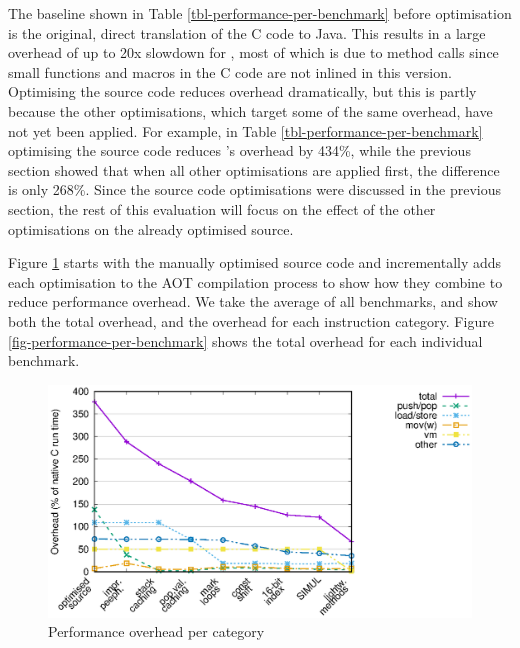 The baseline shown in Table \ref{tbl-performance-per-benchmark} before optimisation is the original, direct translation of the C code to Java. This results in a large overhead of up to 20x slowdown for , most of which is due to method calls since small functions and macros in the C code are not inlined in this version. Optimising the source code reduces overhead dramatically, but this is partly because the other optimisations, which target some of the same overhead, have not yet been applied. For example, in Table \ref{tbl-performance-per-benchmark} optimising the source code reduces 's overhead by 434\%, while the previous section showed that when all other optimisations are applied first, the difference is only 268\%. Since the source code optimisations were discussed in the previous section, the rest of this evaluation will focus on the effect of the other optimisations on the already optimised source.

Figure \ref{fig-performance-per-opcode-category} starts with the manually optimised source code and incrementally adds each optimisation to the AOT compilation process to show how they combine to reduce performance overhead. We take the average of all benchmarks, and show both the total overhead, and the overhead for each instruction category. Figure \ref{fig-performance-per-benchmark} shows the total overhead for each individual benchmark.

\begin{figure}
\centering
\includegraphics[width=\mygraphsize]{performance-per-opcode-category3a.eps}
\caption{Performance overhead per category}
\label{fig-performance-per-opcode-category}
\end{figure}

